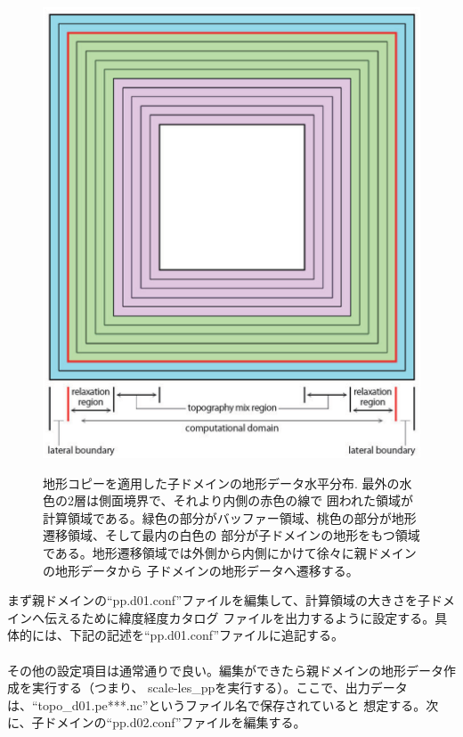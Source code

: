 \begin{figure}[tb]
\begin{center}
  \includegraphics[width=0.4\hsize]{./figure/topo_copy.eps}\\
  \caption{地形コピーを適用した子ドメインの地形データ水平分布. 最外の水色の2層は側面境界で、それより内側の赤色の線で
           囲われた領域が計算領域である。緑色の部分がバッファー領域、桃色の部分が地形遷移領域、そして最内の白色の
           部分が子ドメインの地形をもつ領域である。地形遷移領域では外側から内側にかけて徐々に親ドメインの地形データから
           子ドメインの地形データへ遷移する。}
  \label{fig_topocopy}
\end{center}
\end{figure}

まず親ドメインの``pp.d01.conf''ファイルを編集して、計算領域の大きさを子ドメインへ伝えるために緯度経度カタログ
ファイルを出力するように設定する。具体的には、下記の記述を``pp.d01.conf''ファイルに追記する。\\

\\

\noindent その他の設定項目は通常通りで良い。編集ができたら親ドメインの地形データ作成を実行する（つまり、
scale-les\_ppを実行する）。ここで、出力データは、``topo\_d01.pe***.nc''というファイル名で保存されていると
想定する。次に、子ドメインの``pp.d02.conf''ファイルを編集する。\\

